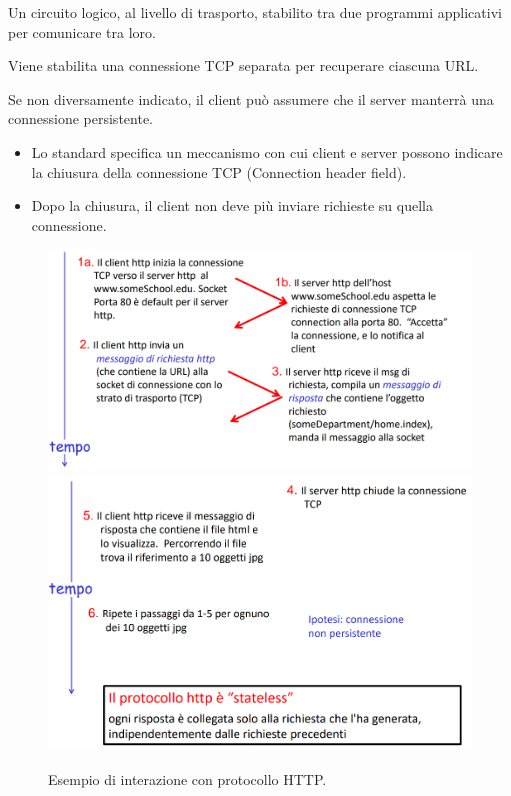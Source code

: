\begin{definition}[Connessione]
    Un circuito logico, al livello di trasporto, stabilito tra due programmi applicativi per comunicare tra loro.    
\end{definition}
\begin{definition}
    Viene stabilita una connessione TCP separata per recuperare ciascuna URL.
\end{definition}
\begin{definition}
    Se non diversamente indicato, il client può assumere che il server manterrà una connessione persistente.
    \begin{itemize}
        \item Lo standard specifica un meccanismo con cui client e server possono indicare la chiusura della connessione TCP (Connection header field).
        \item Dopo la chiusura, il client non deve più inviare richieste su quella connessione.
    \end{itemize}
\end{definition}

\begin{figure}[h]
    \centering
    \includegraphics[scale=0.28]{Immagini/Esempio_richiesta_HTTP.png}
    \includegraphics[scale=0.30]{Immagini/Esempio_richiesta_HTTP_2.png}
    \caption{Esempio di interazione con protocollo HTTP.}
\end{figure}

